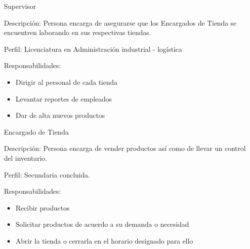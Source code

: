 \begin{Stakeholder}{Supervisor}
		\item[Descripción:] Persona encarga de asegurarse que los Encargados de Tienda se encuentren laborando en sus respectivas tiendas.
		
        \item[Perfil:] Licenciatura en Administración industrial - logística
        
        \item[Responsabilidades:]\hspace{1em}
         \begin{itemize}
        	\item Dirigir al personal de cada tienda
		\item Levantar reportes de empleados
		\item Dar de alta nuevos productos	
        \end{itemize}
        
\end{Stakeholder}

\begin{Stakeholder}{Encargado de Tienda}
		\item[Descripción:] Persona encarga de vender productos así como de llevar un control del inventario.
		
        \item[Perfil:] Secundaria concluida.
        
        \item[Responsabilidades:]\hspace{1em}
         \begin{itemize}
        	\item Recibir productos
		\item Solicitar productos de acuerdo a su demanda o necesidad
		\item Abrir la tienda o cerrarla en el horario designado para ello
        \end{itemize}
\end{Stakeholder}



